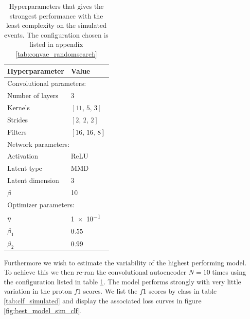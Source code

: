 \begin{table}
\centering
\setlength{\extrarowheight}{15pt}
\hspace*{-0.5in}
\begin{tabular}{ll}
\toprule
Hyperparameter & Value \\
\midrule
\multicolumn{2}{l}{Convolutional parameters: } \\
\midrule
Number of layers & 3\\
Kernels & $[11,\, 5,\, 3]$\\
Strides & $[2,\, 2,\, 2]$\\
Filters & $[16,\, 16,\, 8]$ \\ 
\midrule
\multicolumn{2}{l}{Network parameters: } \\
\midrule
Activation & ReLU \\
Latent type & MMD \\
Latent dimension & $3$ \\
$\beta$ & \num{10} \\
\midrule
\multicolumn{2}{l}{Optimizer parameters: } \\
\midrule
$\eta$ &  \num{1e-1} \\
$\beta_1$ & $0.55$ \\
$\beta_2$ & $0.99$ \\
\bottomrule
\end{tabular}
\caption{Hyperparameters that gives the strongest performance with the least complexity on the simulated events. The configuration chosen is listed in appendix \ref{tab:convae_randomsearch}}\label{tab:param_vals_sim_convae}
\end{table}

Furthermore we wish to estimate the variability of the highest performing model. To achieve this we then re-ran the convolutional autoencoder $N=10$ times using the configuration listed in table \ref{tab:param_vals_sim_convae}. The model performs strongly with very little variation in the proton $f1$ scores. We list the $f1$ scores by class in table \ref{tab:clf_simulated} and display the associated loss curves in figure \ref{fig:best_model_sim_clf}.


